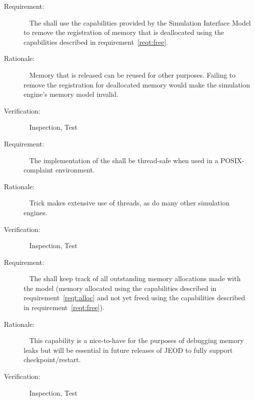 \label{reqt:deregistration}
\begin{description}
\item[Requirement:]\ \newline
  The \ModelDesc shall use the capabilities provided by the Simulation
  Interface Model to remove the registration of memory that is deallocated
  using the capabilities described in requirement~\ref{reqt:free}.

\item[Rationale:]\ \newline
  Memory that is released can be reused for other purposes. Failing to remove
  the registration for deallocated memory would make the simulation engine's
  memory model invalid.

\item[Verification:]\ \newline
  Inspection, Test
\end{description}


\label{reqt:threads}
\begin{description}
\item[Requirement:]\ \newline
  The implementation of the \ModelDesc shall be thread-safe when used in
  a POSIX-complaint environment.

\item[Rationale:]\ \newline
  Trick makes extensive use of threads, as do many other simulation engines.

\item[Verification:]\ \newline
  Inspection, Test
\end{description}


\label{reqt:tracking}
\begin{description}
\item[Requirement:]\ \newline
  The \ModelDesc shall keep track of all outstanding memory allocations made
  with the model (memory allocated using the capabilities described in
  requirement~\ref{reqt:alloc} and not yet freed using the capabilities
  described in requirement~\ref{reqt:free}).

\item[Rationale:]\ \newline
  This capability is a nice-to-have for the purposes of debugging memory leaks
  but will be essential in future releases of JEOD to fully support
  checkpoint/restart.

\item[Verification:]\ \newline
  Inspection, Test
\end{description}


